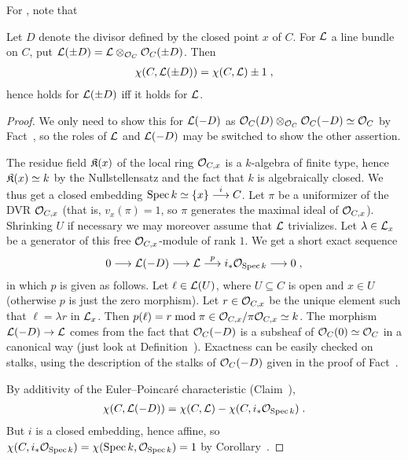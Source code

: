 \documentclass[a4paper,parskip=half,numbers=enddot, DIV=12]{scrreprt}
\begin{document}
For , note that
\begin{fact}
	Let $D$ denote the divisor defined by the closed point $x$ of $C$. For $\mathcal{L}$ a line bundle on $C$, put $\mathcal{L}(\pm D)=\mathcal{L}\otimes_{\mathcal{O}_C}\mathcal{O}_C(\pm D)$. Then
	\begin{align*}
		\chi(C,\mathcal{L}(\pm D))=\chi(C,\mathcal{L})\pm 1\;,
	\end{align*}
	hence  holds for $\mathcal{L}(\pm D)$ iff it holds for $\mathcal{L}$.
\end{fact}
\begin{proof}
	We only need to show this for $\mathcal{L}(-D)$ as $\mathcal{O}_C(D)\otimes_{\mathcal{O}_C}\mathcal{O}_C(-D)\simeq \mathcal{O}_C$ by Fact~, so the roles of $\mathcal{L}$ and $\mathcal{L}(-D)$ may  be switched to show the other assertion.
	
	The residue field $\mathfrak{K}(x)$ of the local ring $\mathcal{O}_{C,x}$ is a $k$-algebra of finite type, hence $\mathfrak{K}(x)\simeq k$ by the Nullstellensatz and the fact that $k$ is algebraically closed. We thus get a closed embedding $\Spec k\simeq\{x\}\morphism[i]C$. Let $\pi$ be a uniformizer of the DVR $\mathcal{O}_{C,x}$ (that is, $v_x(\pi)=1$, so $\pi$ generates the maximal ideal of $\mathcal{O}_{C,x}$). Shrinking $U$ if necessary we may moreover assume that $\mathcal{L}$ trivializes. Let $\lambda\in\mathcal{L}_x$ be a generator of this free $\mathcal{O}_{C,x}$-module of rank $1$. We get a short exact sequence
	\begin{align*}
		0\morphism\Ll(-D)\morphism\Ll\morphism[p]i_*\Oo_{\Spec k}\morphism 0\;,
	\end{align*}
	in which $p$ is given as follows. Let $\ell\in\mathcal{L}(U)$, where $U\subseteq C$ is open and $x\in U$ (otherwise $p$ is just the zero morphism). Let $r\in\mathcal{O}_{C,x}$ be the unique element such that $\ell=\lambda r$ in $\mathcal{L}_x$. Then $p(\ell)=r\bmod \pi\in\mathcal{O}_{C,x}/\pi\mathcal{O}_{C,x}\simeq k$. The morphism $\Ll(-D)\morphism\Ll$ comes from the fact that $\mathcal{O}_C(-D)$ is a subsheaf of $\mathcal{O}_C(0)\simeq \mathcal{O}_C$ in a canonical way (just look at Definition~). Exactness can be easily checked on stalks, using the description of the stalks of $\mathcal{O}_C(-D)$ given in the proof of Fact~. 
	
	By additivity of the Euler--Poincaré characteristic (Claim~), 
	\begin{align*}
			\chi(C,\mathcal{L}(-D))=\chi(C,\mathcal{L})-\chi(C,i_*\mathcal{O}_{\operatorname{Spec} k})\;.
	\end{align*}
	But $i$ is a closed embedding, hence affine, so $\chi(C,i_*\mathcal{O}_{\operatorname{Spec} k})=\chi(\operatorname{Spec} k,\mathcal{O}_{\operatorname{Spec} k})=1$ by Corollary~.
\end{proof}
\end{document}
